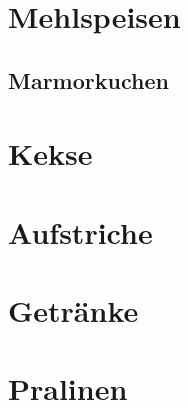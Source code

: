 \documentclass[ngerman,11pt,parskip=half,a5paper,twoside]{scrbook}
\begin{document}
\clearpage

\chapter{Mehlspeisen}

\clearpage

	\section{Marmorkuchen} 
	 
	\clearpage
	
\chapter{Kekse}

\clearpage

\chapter{Aufstriche}

\clearpage

\chapter{Getränke}

\clearpage

\chapter{Pralinen}

\clearpage

	
\end{document}
